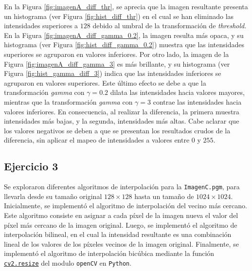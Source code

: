 \documentclass[11pt, twocolumn]{article}
\begin{document}
En la Figura \ref{fig:imagenA_diff_thr}, se aprecia que la imagen resultante presenta un histograma (ver Figura \ref{fig:hist_diff_thr}) en el cual se han eliminado las intensidades superiores a $128$ debido al umbral de la transformación de \textit{threshold}. En la Figura \ref{fig:imagenA_diff_gamma_0.2}, la imagen resulta más opaca, y su histograma (ver Figura \ref{fig:hist_diff_gamma_0.2}) muestra que las intensidades superiores se agruparon en valores inferiores. Por otro lado, la imagen de la Figura \ref{fig:imagenA_diff_gamma_3} es más brillante, y su histograma (ver Figura \ref{fig:hist_gamma_diff_3}) indica que las intensidades inferiores se agruparon en valores superiores. Este último efecto se debe a que la transformación \textit{gamma} con $\gamma = 0.2$ dilata las intensidades hacia valores mayores, mientras que la transformación \textit{gamma} con $\gamma = 3$ contrae las intensidades hacia valores inferiores. En consecuencia, al realizar la diferencia, la primera muestra intensidades más bajas, y la segunda, intensidades más altas. Cabe aclarar que los valores negativos se deben a que se presentan los resultados crudos de la diferencia, sin aplicar el mapeo de intensidades a valores entre $0$ y $255$.

\subsection*{Ejercicio 3}
Se exploraron diferentes algoritmos de interpolación para la \texttt{ImagenC.pgm}, para llevarla desde su tamaño original $128 \times 128$ hasta un tamaño de $1024 \times 1024$. Inicialmente, se implementó el algoritmo de interpolación del vecino más cercano. Este algoritmo consiste en asignar a cada píxel de la imagen nueva el valor del píxel más cercano de la imagen original. Luego, se implementó el algoritmo de interpolación bilineal, en el cual la intensidad resultante es una combinación lineal de los valores de los píxeles vecinos de la imagen original. Finalmente, se implementó el algoritmo de interpolación bicúbica mediante la función \href{https://docs.opencv.org/3.4/da/d54/group__imgproc__transform.html#ga47a974309e9102f5f08231edc7e7529d}{\texttt{cv2.resize}} del modulo \texttt{openCV} en \texttt{Python}. 
\end{document}
